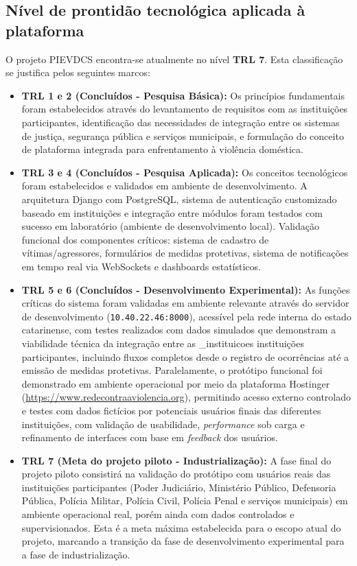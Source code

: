 \subsection{Nível de prontidão tecnológica aplicada à plataforma}

\par O projeto PIEVDCS encontra-se atualmente no nível \textbf{TRL 7}. Esta classificação se justifica pelos seguintes marcos:

\begin{itemize}
   \item \textbf{TRL 1 e 2 (Concluídos - Pesquisa Básica):} Os princípios fundamentais foram estabelecidos através do levantamento de requisitos com as instituições participantes, identificação das necessidades de integração entre os sistemas de justiça, segurança pública e serviços municipais, e formulação do conceito de plataforma integrada para enfrentamento à violência doméstica.
    
   \item \textbf{TRL 3 e 4 (Concluídos - Pesquisa Aplicada):} Os conceitos tecnológicos foram estabelecidos e validados em ambiente de desenvolvimento. A arquitetura Django com PostgreSQL, sistema de autenticação customizado baseado em instituições e integração entre módulos foram testados com sucesso em laboratório (ambiente de desenvolvimento local). Validação funcional dos componentes críticos: sistema de cadastro de vítimas/agressores, formulários de medidas protetivas, sistema de notificações em tempo real via WebSockets e dashboards estatísticos.
    
   \item \textbf{TRL 5 e 6 (Concluídos - Desenvolvimento Experimental):} As funções críticas do sistema foram validadas em ambiente relevante através do servidor de desenvolvimento (\texttt{10.40.22.46:8000}), acessível pela rede interna do estado catarinense, com testes realizados com dados simulados que demonstram a viabilidade técnica da integração entre as \numero_instituicoes{} instituições participantes, incluindo fluxos completos desde o registro de ocorrências até a emissão de medidas protetivas. Paralelamente, o protótipo funcional foi demonstrado em ambiente operacional por meio da plataforma Hostinger (\href{https://www.redecontraaviolencia.org}{https://www.redecontraaviolencia.org}), permitindo acesso externo controlado e testes com dados fictícios por potenciais usuários finais das diferentes instituições, com validação de usabilidade, \textit{performance} sob carga e refinamento de interfaces com base em \textit{feedback} dos usuários.
    
   \item \textbf{TRL 7 (Meta do projeto piloto - Industrialização):} A fase final do projeto piloto consistirá na validação do protótipo com usuários reais das instituições participantes (Poder Judiciário, Ministério Público, Defensoria Pública, Polícia Militar, Polícia Civil, Polícia Penal e serviços municipais) em ambiente operacional real, porém ainda com dados controlados e supervisionados. Esta é a meta máxima estabelecida para o escopo atual do projeto, marcando a transição da fase de desenvolvimento experimental para a fase de industrialização.
\end{itemize}

